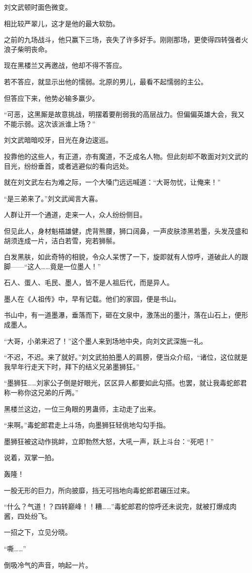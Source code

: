 \begin{this_body}
刘文武顿时面色微变。

相比较严翠儿，这才是他的最大软肋。

之前的九场战斗，他只赢下三场，丧失了许多好手。刚刚那场，更使得四转强者火浪子柴明丧命。

现在黑楼兰又再邀战，他却不得不答应。

若不答应，就显示出他的懦弱。北原的男儿，最看不起懦弱的主公。

但答应下来，他势必输多赢少。

“可恶，这黑厮是故意挑战，明摆着要削弱我的高层战力。但偏偏英雄大会，我又不能示弱。这次该派谁上场？”

刘文武暗暗咬牙，目光在身边逡巡。

投靠他的这些人，有正道，亦有魔道，不乏成名人物。但此刻却不敢面对刘文武的目光，纷纷垂首，或者逃避似的看向远处。

就在刘文武左右为难之际，一个大嗓门远远喊道：“大哥勿忧，让俺来！”

“是三弟来了。”刘文武闻言大喜。

人群让开一个通道，走来一人，众人纷纷侧目。

但见此人，身材魁梧雄健，虎背熊腰，狮口阔鼻，一声皮肤漆黑若墨，头发茂盛和胡须连成一片，洁白若雪，宛若狮鬃。

白发黑肤，如此奇特的相貌，令众人呆愣了一下，旋即就有人惊呼，道破此人的跟脚——“这人……竟是一位墨人！”

石人、蛋人、毛民、墨人，皆不是人祖后代，而是异人。

墨人在《人祖传》中，早有记载。他们的家园，便是书山。

书山中，有一道墨瀑，垂落而下，砸在文泉中，激荡出的墨汁，落在山石上，便形成墨人。

“大哥，小弟来迟了！”这个墨人来到场地中央，向刘文武深施一礼。

“不迟，不迟。来了就好。”刘文武拍拍墨人的肩膀，便当众介绍，“诸位，这位就是我早年行走天下时，拜下的结义兄弟墨狮狂。”

“墨狮狂……刘家公子倒是好眼光，区区异人都要如此勾搭。也罢，就让我毒蛇郎君称一称你这兄弟的斤两。”

黑楼兰这边，一位三角眼的男蛊师，主动走了出来。

“来啊。”毒蛇郎君走上斗场，向墨狮狂轻佻地勾勾手指。

墨狮狂被这动作挑衅，立即勃然大怒，大吼一声，跃上斗台：“死吧！”

说着，双掌一拍。

轰隆！

一股无形的巨力，所向披靡，挡无可挡地向毒蛇郎君碾压过来。

“什么？气道！？四转巅峰！！糟……”毒蛇郎君的惊呼还未说完，就被打爆成肉酱，四处纷飞。

一招之下，立见分晓。

“嘶……”

倒吸冷气的声音，响起一片。

\end{this_body}

